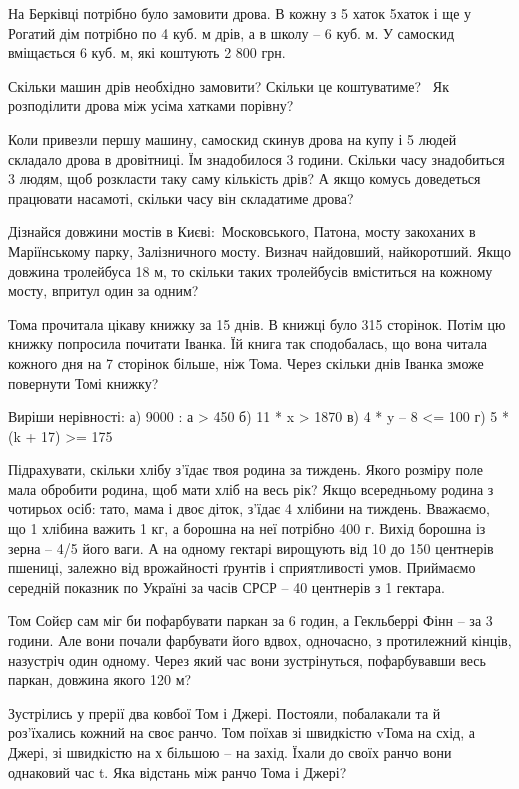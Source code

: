 \problem
На Берківці потрібно було замовити дрова.
В кожну з 5 хаток 5хаток і ще у Рогатий дім потрібно по 4 куб. м дрів,
а в школу – 6 куб. м.
У самоскид вміщається 6 куб. м, які коштують 2 800 грн.

Скільки машин дрів необхідно замовити? Скільки це коштуватиме? 
Як розподілити дрова між усіма хатками порівну?

Коли привезли першу машину, самоскид скинув дрова на купу і 5 людей
складало дрова в дровітниці. Їм знадобилося 3 години.
Скільки часу знадобиться 3 людям, щоб розкласти таку саму кількість дрів?
А якщо комусь доведеться працювати насамоті, скільки часу він складатиме дрова?


\problem
Дізнайся довжини мостів в Києві: Московського, Патона,
мосту закоханих в Маріїнському парку, Залізничного мосту.
Визнач найдовший, найкоротший.
Якщо довжина тролейбуса 18 м, то скільки таких тролейбусів
вміститься на кожному мосту, впритул один за одним?


\problem
Тома прочитала цікаву книжку за 15 днів. В книжці було 315 сторінок.
Потім цю книжку попросила почитати Іванка. Їй книга так сподобалась,
що вона читала кожного дня на 7 сторінок більше, ніж Тома.
Через скільки днів Іванка зможе повернути Томі книжку?


\problem
Виріши нерівності:
а) 9000 : а > 450
б) 11 * x > 1870
в) 4 * y – 8 <= 100
г) 5 * (k + 17) >= 175


\problem
Підрахувати, скільки хлібу з’їдає твоя родина за тиждень.
Якого розміру поле мала обробити родина, щоб мати хліб на весь рік?
Якщо всередньому родина з чотирьох осіб: тато, мама і двоє діток,
з’їдає 4 хлібини на тиждень. Вважаємо, що 1 хлібина важить 1 кг,
а борошна на неї потрібно 400 г. Вихід борошна із зерна – 4/5 його ваги.
А на одному гектарі вирощують від 10 до 150 центнерів пшениці,
залежно від врожайності ґрунтів і сприятливості умов.
Приймаємо середній показник по Україні за часів СРСР –
40 центнерів з 1 гектара.


\problem
Том Сойєр сам міг би пофарбувати паркан за 6 годин,
а Гекльберрі Фінн – за 3 години. Але вони почали фарбувати його вдвох,
одночасно, з протилежний кінців, назустріч один одному.
Через який час вони зустрінуться, пофарбувавши весь паркан,
довжина якого 120 м?


\problem
Зустрілись у прерії два ковбої Том і Джері. Постояли, побалакали та й
роз’їхались кожний на своє ранчо. Том поїхав зі швидкістю vТома на схід,
а Джері, зі швидкістю на х більшою – на захід. Їхали до своїх ранчо
вони однаковий час t. Яка відстань між ранчо Тома і Джері?

